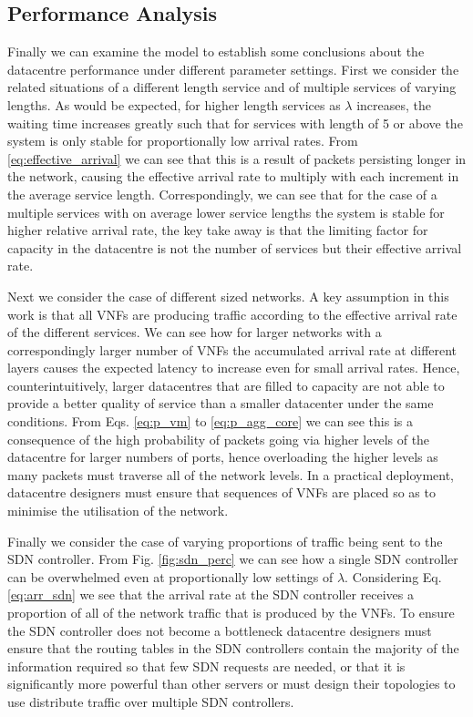\subsection{Performance Analysis}
Finally we can examine the model to establish some conclusions about the datacentre performance under different parameter settings. First we consider the related situations of a different length service and of multiple services of varying lengths. As would be expected, for higher length services as $\lambda$ increases, the waiting time increases greatly such that for services with length of 5 or above the system is only stable for proportionally low arrival rates. From \ref{eq:effective_arrival} we can see that this is a result of packets persisting longer in the network, causing the effective arrival rate to multiply with each increment in the average service length. Correspondingly, we can see that for the case of a multiple services with on average lower service lengths the system is stable for higher relative arrival rate, the key take away is that the limiting factor for capacity in the datacentre is not the number of services but their effective arrival rate.

Next we consider the case of different sized networks. A key assumption in this work is that all VNFs are producing traffic according to the effective arrival rate of the different services. We can see how for larger networks with a correspondingly larger number of VNFs the accumulated arrival rate at different layers causes the expected latency to increase even for small arrival rates. Hence, counterintuitively, larger datacentres that are filled to capacity are not able to provide a better quality of service than a smaller datacenter under the same conditions. From Eqs. \ref{eq:p_vm} to \ref{eq:p_agg_core} we can see this is a consequence of the high probability of packets going via higher levels of the datacentre for larger numbers of ports, hence overloading the higher levels as many packets must traverse all of the network levels. In a practical deployment, datacentre designers must ensure that sequences of VNFs are placed so as to minimise the utilisation of the network.

Finally we consider the case of varying proportions of traffic being sent to the SDN controller. From Fig. \ref{fig:sdn_perc} we can see how a single SDN controller can be overwhelmed even at proportionally low settings of $\lambda$. Considering Eq. \ref{eq:arr_sdn} we see that the arrival rate at the SDN controller receives a proportion of all of the network traffic that is produced by the VNFs. To ensure the SDN controller does not become a bottleneck datacentre designers must ensure that the routing tables in the SDN controllers contain the majority of the information required so that few SDN requests are needed, or that it is significantly more powerful than other servers or must design their topologies to use distribute traffic over multiple SDN controllers.